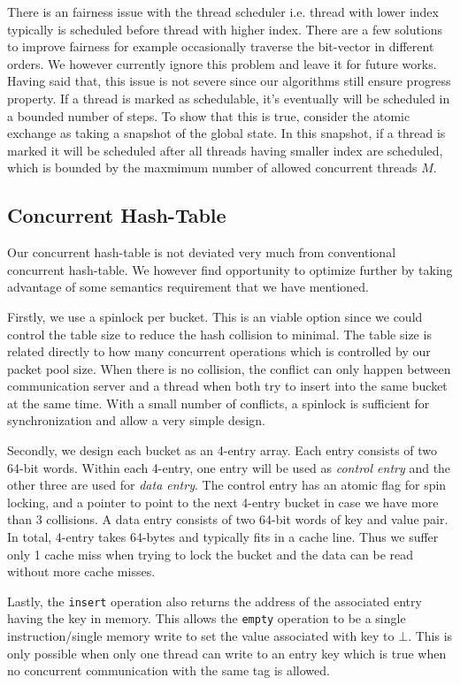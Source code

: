 \documentclass{sig-alternate-05-2015}
\begin{document}
There is an fairness issue with the thread scheduler i.e. thread with lower
index typically is scheduled before thread with higher index. There are a few
solutions to improve fairness for example occasionally traverse the bit-vector
in different orders. We however currently ignore this problem and leave it for
future works. Having said that, this issue is not severe since our algorithms
still ensure progress property. If a thread is marked as schedulable, it's
eventually will be scheduled in a bounded number of steps. To show that this is
true, consider the atomic exchange as taking a snapshot of the global state. In
this snapshot, if a thread is marked it will be scheduled after all threads
having smaller index are scheduled, which is bounded by the maxmimum number of
allowed concurrent threads $M$.

\subsection{Concurrent Hash-Table}
Our concurrent hash-table is not deviated very much from conventional
concurrent hash-table. We however find opportunity to optimize further by taking 
advantage of some semantics requirement that we have mentioned.

Firstly, we use a spinlock per bucket. This is an viable option since we could
control the table size to reduce the hash collision to minimal. The table size is
related directly to how many concurrent operations which is controlled by 
our packet pool size. When there is no collision, the conflict can only happen
between communication server and a thread when both try to insert into the same
bucket at the same time. With a small number of conflicts, a spinlock is
sufficient for synchronization and allow a very simple design.

Secondly, we design each bucket as an 4-entry array. Each entry consists of two
64-bit words. Within each 4-entry, one entry will be used as \textit{control
entry} and the other three are used for \textit{data entry}. The control entry
has an atomic flag for spin locking, and a pointer to point to the next 4-entry
bucket in case we have more than 3 collisions. A data entry consists of two
64-bit words of key and value pair. In total, 4-entry takes 64-bytes and
typically fits in a cache line. Thus we suffer only 1 cache miss when trying to
lock the bucket and the data can be read without more cache misses.

Lastly, the \texttt{insert} operation also returns the address of the
associated entry having the key in memory. This allows the \texttt{empty}
operation to be a single instruction/single memory write to set the value
associated with key to $\bot$. This is only possible when only one thread can
write to an entry key which is true when no concurrent communication with the
same tag is allowed.
\end{document}
